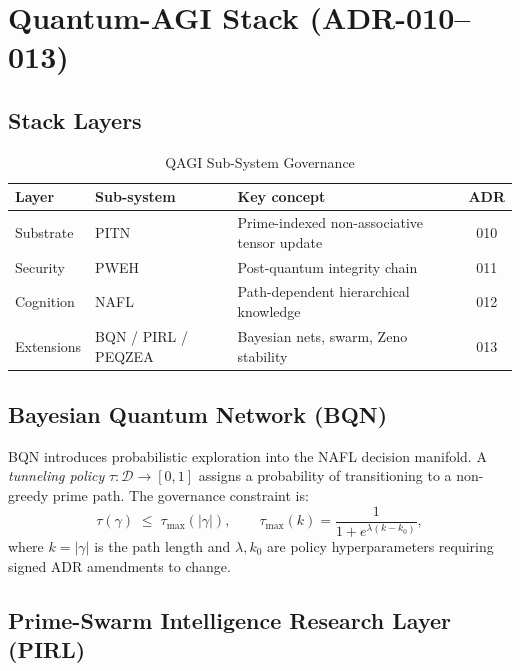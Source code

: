 \documentclass[12pt,a4paper]{article}
\theoremstyle{definition}
\theoremstyle{plain}
\theoremstyle{remark}
\begin{document}
\newpage

\section{Quantum-AGI Stack (ADR-010--013)}
\label{sec:qagi}

\subsection{Stack Layers}

\begin{table}[h!]
\centering
\caption{QAGI Sub-System Governance}
\begin{tabular}{lllc}
\toprule
\textbf{Layer} & \textbf{Sub-system} & \textbf{Key concept} & \textbf{ADR} \\
\midrule
Substrate   & PITN                 & Prime-indexed non-associative tensor update   & 010 \\
Security    & PWEH                 & Post-quantum integrity chain                  & 011 \\
Cognition   & NAFL                 & Path-dependent hierarchical knowledge         & 012 \\
Extensions  & BQN / PIRL / PEQZEA  & Bayesian nets, swarm, Zeno stability          & 013 \\
\bottomrule
\end{tabular}
\end{table}

\subsection{Bayesian Quantum Network (BQN)}

BQN introduces probabilistic exploration into the NAFL decision manifold. A
\emph{tunneling policy} $\tau : \mathcal{D} \to [0,1]$ assigns a probability
of transitioning to a non-greedy prime path. The governance constraint is:
\begin{equation}
  \tau(\gamma) \;\le\; \tau_{\max}(|\gamma|), \qquad
  \tau_{\max}(k) = \frac{1}{1 + e^{\lambda(k - k_0)}},
\end{equation}
where $k = |\gamma|$ is the path length and $\lambda, k_0$ are policy
hyperparameters requiring signed ADR amendments to change.

\subsection{Prime-Swarm Intelligence Research Layer (PIRL)}
\end{document}
